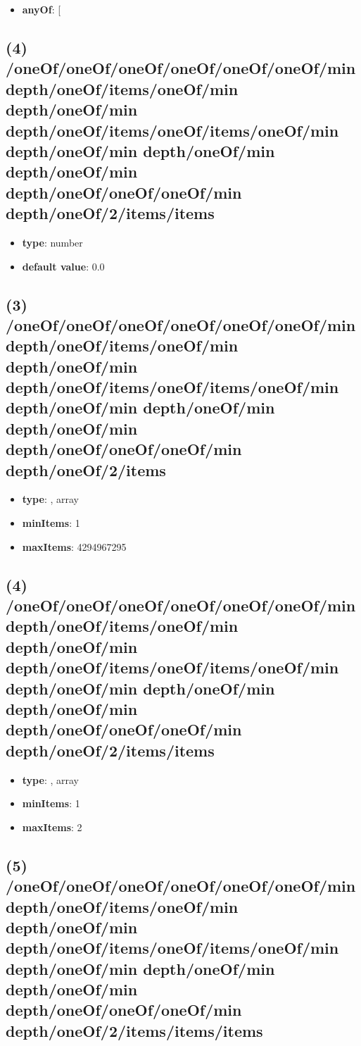 \begin{itemize}[leftmargin=4em]\item {\bf anyOf}: [\end{itemize}\subsection{(4) /oneOf/oneOf/oneOf/oneOf/oneOf/oneOf/min depth/oneOf/items/oneOf/min depth/oneOf/min depth/oneOf/items/oneOf/items/oneOf/min depth/oneOf/min depth/oneOf/min depth/oneOf/min depth/oneOf/oneOf/oneOf/min depth/oneOf/2/items/items}
\begin{itemize}[leftmargin=4em]\item {\bf type}: number\item {\bf default value}: 0.0
\end{itemize}\subsection{(3) /oneOf/oneOf/oneOf/oneOf/oneOf/oneOf/min depth/oneOf/items/oneOf/min depth/oneOf/min depth/oneOf/items/oneOf/items/oneOf/min depth/oneOf/min depth/oneOf/min depth/oneOf/min depth/oneOf/oneOf/oneOf/min depth/oneOf/2/items}
\begin{itemize}[leftmargin=3em]\item {\bf type}: , array\item {\bf minItems}: 1
\item {\bf maxItems}: 4294967295
\end{itemize}\subsection{(4) /oneOf/oneOf/oneOf/oneOf/oneOf/oneOf/min depth/oneOf/items/oneOf/min depth/oneOf/min depth/oneOf/items/oneOf/items/oneOf/min depth/oneOf/min depth/oneOf/min depth/oneOf/min depth/oneOf/oneOf/oneOf/min depth/oneOf/2/items/items}
\begin{itemize}[leftmargin=4em]\item {\bf type}: , array\item {\bf minItems}: 1
\item {\bf maxItems}: 2
\end{itemize}\subsection{(5) /oneOf/oneOf/oneOf/oneOf/oneOf/oneOf/min depth/oneOf/items/oneOf/min depth/oneOf/min depth/oneOf/items/oneOf/items/oneOf/min depth/oneOf/min depth/oneOf/min depth/oneOf/min depth/oneOf/oneOf/oneOf/min depth/oneOf/2/items/items/items}
